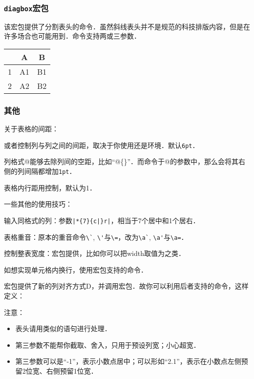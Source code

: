 \subsubsection{\texttt{diagbox}宏包}
该宏包提供了分割表头的命令．虽然斜线表头并不是规范的科技排版内容，但是在许多场合也可能用到．命令支持两或三参数．
\begin{codeshow}
\begin{tabular}{c|cc}
\diagbox{左边}{中间}{右边} & A & B \\
\hline
1 & A1 & B1 \\
2 & A2 & B2 
\end{tabular}
\end{codeshow}

\subsubsection{其他}
关于表格的间距：
\begin{feai}
\item {}或者控制列与列之间的间距，取决于你使用还是环境．默认\texttt{6pt}．
\item 列格式@能够去除列间的空距，比如“@\{\}”．而命令于@的参数中，那么会将其右侧的列间隔都增加\texttt{1pt}．
\item 表格内行距用控制，默认为1．
\end{feai}

一些其他的使用技巧：
\begin{feae}
\item 输入同格式的列：参数\verb+|*{7}{c|}r|+，相当于7个居中和1个居右．
\item 表格重音：原本的重音命令\verb|\`|, \verb|\'|与\verb|\=|，改为\verb|\a`|, \verb|\a'|与\verb|\a=|．
\item 控制整表宽度：宏包提供，比如你可以把width取值为之类．
\item 如想实现单元格内换行，使用宏包支持的命令．
\item 宏包提供了新的列对齐方式D，并调用宏包．故你可以利用后者支持的命令，这样定义：
注意：\begin{itemize}
\item 表头请用类似的语句进行处理．
\item 第三参数不能帮你截取、舍入，只用于预设列宽；小心超宽．
\item 第三参数可以是“-1”，表示小数点居中；可以形如“2.1”，表示在小数点左侧预留2位宽、右侧预留1位宽．
\end{itemize}
\end{feae}

